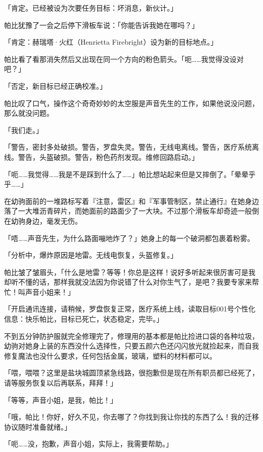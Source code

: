「{\mtzh 肯定。已经被设为次要任务目标：坏消息，新伙计。}」

帕比犹豫了一会之后停下滑板车说：「你能告诉我她在哪吗？」

「{\mtzh 肯定：赫瑞塔·火红（Henrietta Firebright）设为新的目标地点。}」

帕比看了看那消失然后又出现在同一个方向的粉色箭头。「呃……我觉得没设对吧？」

「{\mtzh 否定，新目标已经正确校准。}」

帕比叹了口气，操作这个奇奇妙妙的太空服是声音先生的工作，如果他说没问题，那么就没问题。

「我们走。」

\horizonline


「{\mtzh 警告，密封多处破损。警告，罗盘失灵。警告，无线电离线。警告，医疗系统离线。警告，头盔破损。警告，粉色药剂发现。维修回路启动。}」

「呃……我觉得……我是不是踩到什么了……」帕比想站起来但是又摔倒了。「晕晕乎乎……」

在幼驹面前的一堆路标写着『注意，雷区』和『军事管制区，禁止通行』在她身边落了一大堆沥青碎片，而她面前的路面少了一大块。不过那个滑板车却奇迹一般倒在幼驹身边，毫发无伤。

「唔……声音先生，为什么路面嘣地炸了？」她身上的每一个破洞都包裹着粉雾。

「{\mtzh 分析中，爆炸原因是地雷。无线电恢复，头盔修复。}」

帕比皱了皱眉头，「什么是地雷？等等！你总是这样！说好多听起来很厉害可是我却听不懂的话，那样我就没法因为你说错了什么对你生气了，是吧？我要专家来帮忙！叫声音小姐来！」

「{\mtzh 开启通讯连接，请稍候，罗盘恢复正常，医疗系统上线，读取目标001号个性化信息：快乐帕比，目标已死亡，状态稳定，完毕。}」

不到五分钟防护服就完全修理完了，修理用的基本都是帕比捡进口袋的各种垃圾，幼驹对她身上装的东西没什么选择性，只要五颜六色还闪闪放光就捡起来，而自我修复魔法也没什么要求，任何包括金属，玻璃，塑料的材料都可以。

「喂，喂喂？这里是盐块城圆顶紧急线路，很抱歉但是现在所有职员都已经死了，请等服务恢复以后再联系，拜拜！」

「等等，声音小姐，是我，帕比！」

「哦，帕比！你好，好久不见，你去哪了？你找到我让你找的东西了么！我的迁移协议随时准备就绪。」

「呃……没，抱歉，声音小姐，实际上，我需要帮助。」


